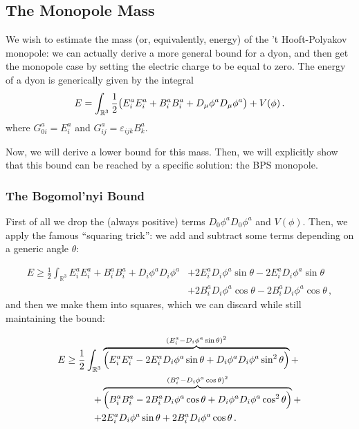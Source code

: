\documentclass[main.tex]{subfiles}
\begin{document}
\subsection{The Monopole Mass}

We wish to estimate the mass (or, equivalently, energy) of the 't Hooft-Polyakov monopole: we can actually derive a more general bound for a dyon, and then get the monopole case by setting the electric charge to be equal to zero.
The energy of a dyon is generically given by the integral
%
\begin{equation} \label{eq:monopole-mass}
  E = \int_{\mathbb{R}^3}
  \frac{1}{2} \qty(E_i^a E_i^a + B_i^a B_i^a + D_\mu \phi^a D_\mu \phi^a) + V(\phi)\,.
\end{equation}
%
where \(G_{0i}^a = E_i^a\) and \(G_{ij}^a = \varepsilon _{ijk} B_k^a\).

Now, we will derive a lower bound for this mass. Then, we will explicitly show that this bound can be reached by a specific solution: the BPS monopole.

\subsubsection{The Bogomol'nyi Bound}

First of all we drop the (always positive) terms \(D_0 \phi^a D_0 \phi^a\) and \(V(\phi)\).
Then, we apply the famous ``squaring trick'': we add and subtract some terms depending on a generic angle \(\theta\):

\begin{equation}
\begin{split}
    E \geq \frac{1}{2}  \int_{\mathbb R^3}   E_i^a E_i^a + B_i^a B_i^a + D_i \phi^a D_i \phi^a &+2 E_i^a D_i \phi^a \sin \theta - 2E_i^a D_i \phi^a \sin \theta \\
  &+2 B_i^a D_i \phi^a \cos \theta - 2 B_i^a D_i \phi^a \cos \theta \,,
\end{split}
\end{equation}
%
and then we make them into squares, which we can discard while still maintaining the bound:
%

\begin{equation}
\begin{split}
    E \geq  \frac{1}{2} \int_{\mathbb R^3}
    &\overbrace{\qty(E_i^a E_i^a - 2 E_i^a D_i\phi^a \sin\theta + D_i\phi^a D_i\phi^a \sin^2\theta)}^{(E_i^a - D_i\phi^a \sin\theta)^2} + \\
    + &\overbrace{\qty( B_i^a B_i^a - 2 B_i^a D_i\phi^a \cos\theta + D_i\phi^a D_i\phi^a \cos^2\theta)}^{(B_i^a - D_i\phi^a \cos\theta)^2} +  \\
    +&2 E_i^a D_i \phi^a \sin \theta+2 B_i^a D_i \phi^a \cos \theta \,.
\end{split}
\end{equation}
\end{document}
